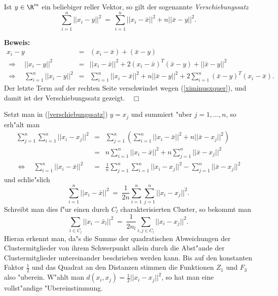 \begin{lemma}
	Ist $y \in \R^m$ ein beliebiger reller Vektor, so gilt der
	sogenannte {\em Verschiebungssatz}
	\begin{equation}
		\label{verschiebungssatz}
		\sum_{i=1}^n || x_i - y||^2 \ = \ \sum_{i=1}^n ||x_i - \bar x||^2 +
		n || \bar x - y ||^2 .
	\end{equation}
\end{lemma}
{\bf Beweis:}
\vspace*{-3mm}
\begin{eqnarray*}
	x_i - y & = & (x_i -\bar x) + (\bar x - y) \\
	\Rightarrow \quad || x_i - y ||^2 & = & || x_i - \bar x ||^2 + 2(x_i -
	\bar x)^T (\bar x - y) + || \bar x - y ||^2 \\
	\Rightarrow \quad \sum_{i=1}^n || x_i - y ||^2 & = & \sum_{i=1}^n 
	|| x_i - \bar x ||^2 + n ||\bar x - y ||^2 + 2  \sum_{i=1}^n
	(\bar x - y)^T(x_i - \bar x).
\end{eqnarray*}
Der letzte Term auf der rechten Seite verschwindet wegen (\ref{ximinusxquer}), 
und damit ist der Verschiebungssatz gezeigt.$\quad\Box$

Setzt man in (\ref{verschiebungssatz}) $y = x_j$ und summiert "uber
$j = 1,\dots,n$, so erh"alt man
\begin{eqnarray*}
	\sum_{j=1}^n \sum_{i=1}^n ||x_i - x_j ||^2 & = &
		\sum_{j=1}^n \left( \sum_{i=1}^n ||x_i - \bar x ||^2 
		+ n ||\bar x - x_j||^2\right) \\
	& = & n\sum_{i=1}^n || x_i - \bar x ||^2 + n \sum_{j=1}^n ||\bar x
		- x_j ||^2\\
	\Leftrightarrow \quad \sum_{i=1}^n || x_i - \bar x ||^2 & = &
		\frac 1 n \sum_{j=1}^n \sum_{i=1}^n || x_i - x_j||^2 - 
		\sum_{j=1}^n ||\bar x - x_j ||^2 
\end{eqnarray*}
und schlie"slich
\[ \sum_{i=1}^n ||x_i - \bar x||^2 \ = \ \frac 1{2n} \sum_{i=1}^n \sum_{j=1}^n
	||x_i - x_j ||^2. \]
Schreibt man dies f"ur einen durch $C_l$ charakterisierten Cluster, 
so bekommt man
\[ \sum_{i \in C_l} || x_i - \bar x_l ||^2 \ = \ 
	\frac 1{2n_l} \sum_{i,j \in C_l} || x_i - x_j ||^2.\]
Hieran erkennt man, da"s die Summe der quadratischen Abweichungen der
Clustermitglieder von ihrem Schwerpunkt allein durch die Abst"ande
der Clustermitglieder untereinander beschrieben werden kann.
Bis auf den konstanten Faktor $\frac 1 2$ und das Quadrat an den 
Distanzen stimmen die Funktionen $Z_1$ und $F_3$ also "uberein. 
W"ahlt man $d(x_i,x_j) = \frac 12 || x_i - x_j ||^2$, so
hat man eine vollst"andige "Ubereinstimmung.

